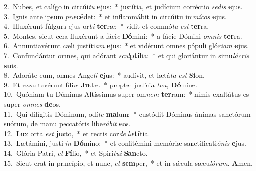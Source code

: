 {2.~}Nubes, et calígo in circúi\textit{tu} \textbf{e}jus:~* justítia, et judícium corréctio \textit{se}\textit{dis} \textbf{e}jus.\\
{3.~}Ignis ante ipsum \textit{præ}\textbf{cé}det:~* et inflammábit in circúitu ini\textit{mí}\textit{cos} \textbf{e}jus.\\
{4.~}Illuxérunt fúlgura ejus or\textit{bi} \textbf{ter}ræ:~* vidit et commó\textit{ta} \textit{est} \textbf{ter}ra.\\
{5.~}Montes, sicut cera fluxérunt a fáci\textit{e} \textbf{Dó}mini:~* a fácie Dómini \textit{om}\textit{nis} \textbf{ter}ra.\\
{6.~}Annuntiavérunt cæli justíti\textit{am} \textbf{e}jus:~* et vidérunt omnes pópuli gló\textit{ri}\textit{am} \textbf{e}jus.\\
{7.~}Confundántur omnes, qui adórant \textit{scul}\textbf{ptí}lia:~* et qui gloriántur in simu\textit{lá}\textit{cris} \textbf{su}is.\\
{8.~}Adoráte eum, omnes Ange\textit{li} \textbf{e}jus:~* audívit, et lætá\textit{ta} \textit{est} \textbf{Si}on.\\
{9.~}Et exsultavérunt fíli\textit{æ} \textbf{Ju}dæ:~* propter judícia \textit{tu}\textit{a}, \textbf{Dó}mine:\\
{10.~}Quóniam tu Dóminus Altíssimus super om\textit{nem} \textbf{ter}ram:~* nimis exaltátus es super \textit{om}\textit{nes} \textbf{de}os.\\
{11.~}Qui dilígitis Dóminum, odí\textit{te} \textbf{ma}lum:~* custódit Dóminus ánimas sanctórum suórum, de manu peccatóris libe\textit{rá}\textit{bit} \textbf{e}os.\\
{12.~}Lux orta \textit{est} \textbf{ju}sto,~* et rectis cor\textit{de} \textit{læ}\textbf{tí}tia.\\
{13.~}Lætámini, justi \textit{in} \textbf{Dó}mino:~* et confitémini memóriæ sanctificati\textit{ó}\textit{nis} \textbf{e}jus.\\
{14.~}Glória Patri, \textit{et} \textbf{Fí}lio,~* et Spirí\textit{tu}\textit{i} \textbf{San}cto.\\
{15.~}Sicut erat in princípio, et nunc, \textit{et} \textbf{sem}per,~* et in sǽcula sæcu\textit{ló}\textit{rum}. \textbf{A}men.\\
